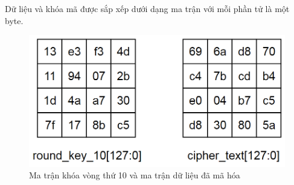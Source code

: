 Dữ liệu và khóa mã được sắp xếp dưới dạng ma trận với mỗi phần tử là một byte.
\begin{figure}[H]
    \centering
    \includegraphics[scale=0.4]{pic/huê/input giải mã.png}
    
    
    \caption{Ma trận khóa vòng thứ 10 và ma trận dữ liệu đã mã hóa}
\end{figure}

